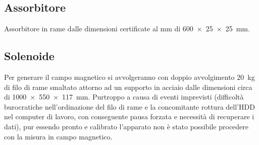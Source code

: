 \subsection{Assorbitore}
Assorbitore in rame dalle dimensioni certificate al mm di \SI{600x25x25}{\milli\metre}.

\subsection{Solenoide}
Per generare il campo magnetico si avvolgeranno con doppio avvolgimento \SI{20}{\kg} di filo di rame smaltato attorno ad un supporto in acciaio dalle dimensioni circa
di \SI{1000x550x117}{\milli\metre}.
Purtroppo a causa  di eventi imprevisti (difficolt\`a burocratiche nell'ordinazione del filo di rame e la concomitante rottura dell'HDD nel computer di lavoro, con conseguente pausa forzata e necessit\`a di recuperare i dati), pur essendo pronto e calibrato l'apparato non \`e stato possibile procedere con la misura in campo magnetico.

